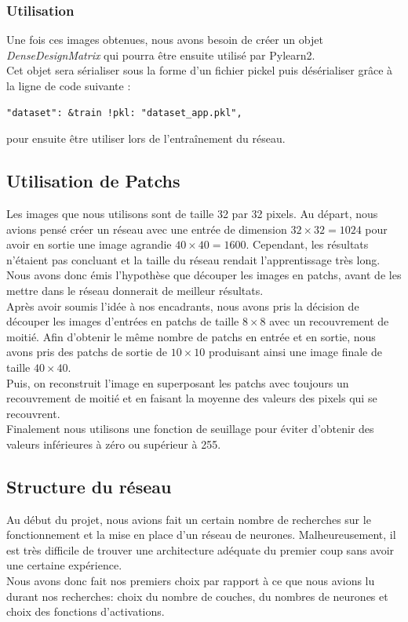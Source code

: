 \documentclass[12pt, a4paper]{article}
\begin{document}
		\subsubsection{Utilisation}
Une fois ces images obtenues, nous avons besoin de créer un objet \emph{DenseDesignMatrix} qui pourra être ensuite utilisé par Pylearn2.\\ Cet objet sera  sérialiser sous la forme d'un fichier pickel puis désérialiser grâce à la ligne de code suivante :
\begin{verbatim}
"dataset": &train !pkl: "dataset_app.pkl",
\end{verbatim}
pour ensuite être utiliser lors de l’entraînement du réseau. 

 
	\subsection{Utilisation de Patchs}
Les images que nous utilisons sont de taille 32 par 32 pixels. Au départ, nous avions pensé créer un réseau avec une entrée de dimension $32 \times 32 = 1024$ pour avoir en sortie une image agrandie $40 \times 40 = 1600$. Cependant, les résultats n'étaient pas concluant et la taille du réseau rendait l'apprentissage très long. Nous avons donc émis l'hypothèse que découper les images en patchs, avant de les mettre dans le réseau donnerait de meilleur résultats.
\\

Après avoir soumis l'idée à nos encadrants, nous avons pris la décision de découper les images d'entrées en patchs de taille $8 \times 8$ avec un recouvrement de moitié. Afin d'obtenir le même nombre de patchs en entrée et en sortie, nous avons pris des patchs de sortie de $10 \times 10$ produisant ainsi une image finale de taille $40 \times 40$.\\ Puis, on reconstruit l'image en superposant les patchs avec toujours un recouvrement de moitié et en faisant la moyenne des valeurs des pixels qui se recouvrent. 
\\

Finalement nous utilisons une fonction de seuillage pour éviter d'obtenir des valeurs inférieures à zéro ou supérieur à 255.

	\subsection{Structure du réseau}
Au début du projet, nous avions fait un certain nombre de recherches sur le fonctionnement et la mise en place d'un réseau de neurones. Malheureusement, il est très difficile de trouver une architecture adéquate du premier coup sans avoir une certaine expérience. \\
Nous avons donc fait nos premiers choix par rapport à ce que nous avions lu durant nos recherches: choix du nombre de couches, du nombres de neurones et choix des fonctions d'activations. 
\end{document}

